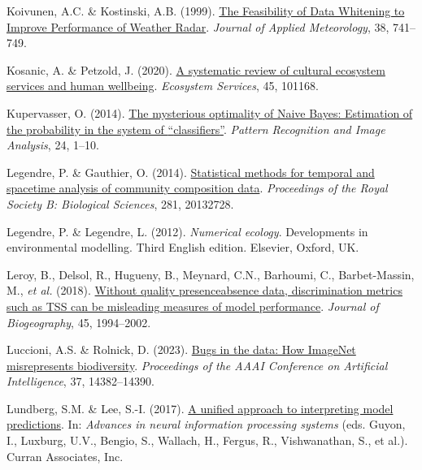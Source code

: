 \documentclass[
  letterpaper,
]{scrbook}
\newlength{\cslhangindent}
\newenvironment{CSLReferences}[2] %
 {\begin{list}{}{%
  \setlength{\itemindent}{0pt}
  \setlength{\leftmargin}{0pt}
  \setlength{\parsep}{0pt}
  \ifodd #1
   \setlength{\leftmargin}{\cslhangindent}
   \setlength{\itemindent}{-1\cslhangindent}
  \fi
  \setlength{\itemsep}{#2\baselineskip}}}
 {\end{list}}
\begin{document}
\begin{CSLReferences}{1}{0}
Koivunen, A.C. \& Kostinski, A.B. (1999).
\href{https://doi.org/10.1175/1520-0450(1999)038\%3C0741:tfodwt\%3E2.0.co;2}{The
Feasibility of Data Whitening to Improve Performance of Weather Radar}.
\emph{Journal of Applied Meteorology}, 38, 741--749.

Kosanic, A. \& Petzold, J. (2020).
\href{https://doi.org/10.1016/j.ecoser.2020.101168}{A systematic review
of cultural ecosystem services and human wellbeing}. \emph{Ecosystem
Services}, 45, 101168.

Kupervasser, O. (2014).
\href{https://doi.org/10.1134/s1054661814010088}{The mysterious
optimality of Naive Bayes: Estimation of the probability in the system
of {``}classifiers{''}}. \emph{Pattern Recognition and Image Analysis},
24, 1--10.

Legendre, P. \& Gauthier, O. (2014).
\href{https://doi.org/10.1098/rspb.2013.2728}{Statistical methods for
temporal and space{\textendash}time analysis of community composition
data}. \emph{Proceedings of the Royal Society B: Biological Sciences},
281, 20132728.

Legendre, P. \& Legendre, L. (2012). \emph{Numerical ecology}.
Developments in environmental modelling. Third English edition.
Elsevier, Oxford, UK.

Leroy, B., Delsol, R., Hugueny, B., Meynard, C.N., Barhoumi, C.,
Barbet-Massin, M., \emph{et al.} (2018).
\href{https://doi.org/10.1111/jbi.13402}{Without quality
presence{\textendash}absence data, discrimination metrics such as TSS
can be misleading measures of model performance}. \emph{Journal of
Biogeography}, 45, 1994--2002.

Luccioni, A.S. \& Rolnick, D. (2023).
\href{https://doi.org/10.1609/aaai.v37i12.26682}{Bugs in the data: How
ImageNet misrepresents biodiversity}. \emph{Proceedings of the AAAI
Conference on Artificial Intelligence}, 37, 14382--14390.

Lundberg, S.M. \& Lee, S.-I. (2017).
\href{https://proceedings.neurips.cc/paper_files/paper/2017/file/8a20a8621978632d76c43dfd28b67767-Paper.pdf}{A
unified approach to interpreting model predictions}. In: \emph{Advances
in neural information processing systems} (eds. Guyon, I., Luxburg,
U.V., Bengio, S., Wallach, H., Fergus, R., Vishwanathan, S., et al.).
Curran Associates, Inc.


\end{CSLReferences}
\end{document}
